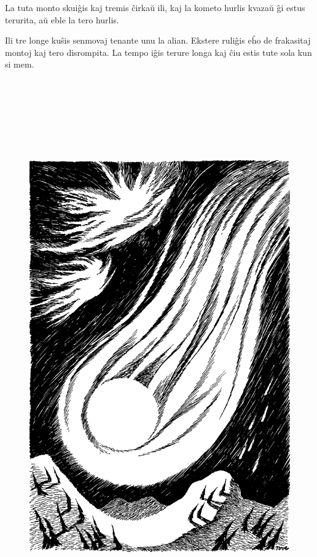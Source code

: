 La tuta monto skuiĝis kaj tremis ĉirkaŭ ili, kaj la kometo hurlis kvazaŭ ĝi estus terurita, aŭ eble la tero hurlis.

Ili tre longe kuŝis senmovaj tenante unu la alian. Ekstere ruliĝis eĥo de frakasitaj montoj kaj tero disrompita. La tempo iĝis terure longa kaj ĉiu estis tute sola kun si mem.

\begin{figure}[htbp]
\centering
\includegraphics[width=449pt,height=677pt]{9-12.png}
\caption{}
\label{9-12}
\end{figure}


